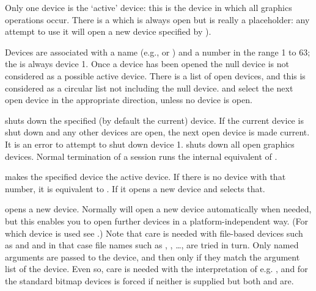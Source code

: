 \begin{Details}\relax
Only one device is the `active' device: this is the device in
which all graphics operations occur.  There is a 
which is always open but is really a placeholder: any attempt to use
it will open a new device specified by
).

Devices are associated with a name (e.g.,  or
) and a number in the range 1 to 63; the
 is always device 1.  Once a device has been
opened the null device is not considered as a possible active device.
There is a list of open devices, and this is considered as a circular
list not including the null device.   and
 select the next open device in the appropriate
direction, unless no device is open.

 shuts down the specified (by default the current)
device.  If the current device is shut down and any other devices are
open, the next open device is made current.  It is an error to
attempt to shut down device 1.   shuts down all
open graphics devices.  Normal termination of a session runs the
internal equivalent of .

 makes the specified device the active device.  If there
is no device with that number, it is equivalent to .
If  it opens a new device and selects that.

 opens a new device.  Normally \R{} will open a new device
automatically when needed, but this enables you to open further
devices in a platform-independent way.  (For which device is used see
.)  Note that care is needed with
file-based devices such as  and
 and in that case file names such as
, , \dots,  are
tried in turn.  Only named arguments are passed to the device, and
then only if they match the argument list of the device.  Even so,
care is needed with the interpretation of e.g. , and for
the standard bitmap devices  is forced if
neither is supplied but both  and  are.
\end{Details}
%
